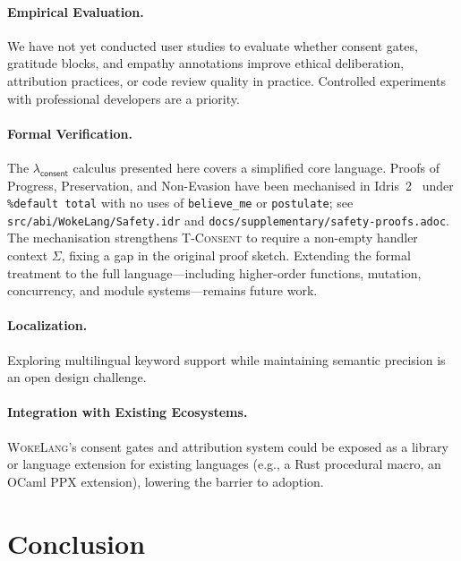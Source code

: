 \documentclass[11pt,a4paper]{article}
\newcommand{\consent}{\mathsf{consent}}
\newcommand{\WokeLang}{\textsc{WokeLang}}
\begin{document}
\paragraph{Empirical Evaluation.}
We have not yet conducted user studies to evaluate whether consent
gates, gratitude blocks, and empathy annotations improve ethical
deliberation, attribution practices, or code review quality in
practice.  Controlled experiments with professional developers are a
priority.

\paragraph{Formal Verification.}
The $\lambda_{\consent}$ calculus presented here covers a simplified
core language.  Proofs of Progress, Preservation, and Non-Evasion have
been mechanised in Idris~2~\citep{brady2021idris2} under
\texttt{\%default total} with no uses of \texttt{believe\_me} or
\texttt{postulate}; see \texttt{src/abi/WokeLang/Safety.idr} and
\texttt{docs/supplementary/safety-proofs.adoc}.  The mechanisation
strengthens \textsc{T-Consent} to require a non-empty handler context
$\Sigma$, fixing a gap in the original proof sketch.  Extending the
formal treatment to the full language---including higher-order
functions, mutation, concurrency, and module systems---remains future
work.

\paragraph{Localization.}
Exploring multilingual keyword support while maintaining semantic
precision is an open design challenge.

\paragraph{Integration with Existing Ecosystems.}
\WokeLang{}'s consent gates and attribution system could be exposed
as a library or language extension for existing languages (e.g., a
Rust procedural macro, an OCaml PPX extension), lowering the barrier
to adoption.

\section{Conclusion}
\label{sec:conclusion}
\end{document}
